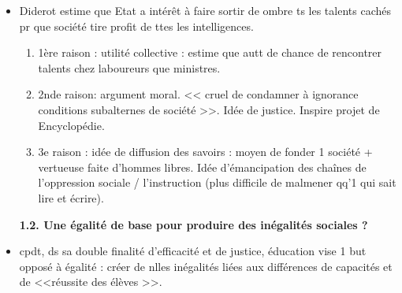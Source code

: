 \documentclass[12pt]{article}
\begin{document}
\begin{itemize}
\item Diderot estime que Etat a intérêt à faire sortir de ombre ts les talents cachés pr que société tire profit de ttes les intelligences.
\begin{enumerate}
\item 1ère raison : utilité collective : estime que autt de chance de rencontrer talents chez laboureurs que ministres. \\
\item 2nde raison: argument moral. << cruel de condamner à ignorance conditions subalternes de société >>. Idée de justice. Inspire projet de Encyclopédie.\\
\item 3e raison : idée de diffusion des savoirs : moyen de fonder 1 société + vertueuse faite d'hommes libres. Idée d'émancipation des chaînes de l'oppression sociale / l'instruction (plus difficile de malmener qq'1 qui sait lire et écrire). \\

\end{enumerate}

\textbf{1.2. Une égalité de base pour produire des inégalités sociales ?}

\item cpdt, ds sa double finalité d'efficacité et de justice, éducation vise 1 but opposé à égalité : créer de nlles inégalités liées aux différences de capacités et de <<réussite des élèves >>.


\end{itemize}
\end{document}
